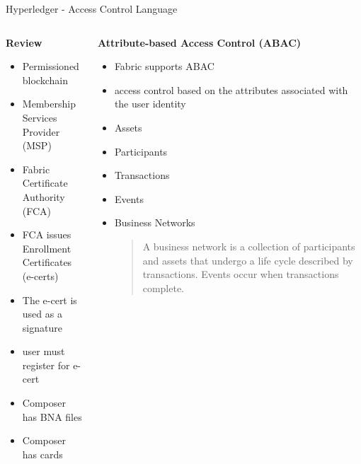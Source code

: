 \documentclass[pdf,table]{beamer}
\begin{document}
\begin{frame}{Hyperledger - Access Control Language}
	\begin{columns}[T]
		\begin{column}{0.48\textwidth}
			{\bf Review}
			\begin{itemize}
				\item Permissioned blockchain 
				\item Membership Services Provider (MSP)
				\item Fabric Certificate Authority (FCA)
				\item FCA issues Enrollment Certificates (e-certs)
				\item The e-cert is used as a signature
				\item user must register for e-cert
				\item Composer has BNA files
				\item Composer has cards
			\end{itemize}
		\end{column}
		\begin{column}{0.48\textwidth}
			{\bf Attribute-based Access Control (ABAC)}
			\begin{itemize}
					\small
				\item Fabric supports ABAC
				\item access control based on the attributes associated with the user identity
				\item Assets
				\item Participants
				\item Transactions
				\item Events
				\item Business Networks
					\begin{quote}
						A business network is a collection of participants and assets that undergo a life cycle described by transactions. Events occur when transactions complete. 
					\end{quote}
			\end{itemize}
		\end{column}
	\end{columns}	
\end{frame}
\end{document}
